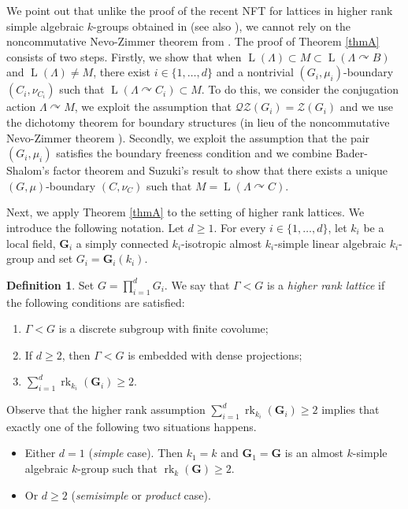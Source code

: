 \documentclass[11pt]{article}
\newenvironment{enumeratei}
{\bgroup\def\theenumi{\roman{enumi}}\def\theenumii{\arabic{enumii}}\begin{enumerate}}
{\end{enumerate}\egroup}
\newcommand{\bG}{\boldsymbol{G}}
\theoremstyle{definition}
\newtheorem*{definition}{Definition}
\DeclareMathOperator{\rk}{rk}
\DeclareMathOperator{\rL}{L}
\begin{document}
We point out that unlike the proof of the recent NFT for lattices in higher rank simple algebraic $k$-groups obtained in \cite{BBH21} (see also \cite{Ho21}), we cannot rely on the noncommutative Nevo-Zimmer theorem from \cite{BH19, BBH21}. The proof of Theorem \ref{thmA} consists of two steps. Firstly, we show that when $\rL(\Lambda) \subset M \subset \rL(\Lambda \curvearrowright B)$ and $\rL(\Lambda) \neq M$, there exist $i \in \{1, \dots, d\}$ and a nontrivial $(G_i, \mu_i)$-boundary $(C_i, \nu_{C_i})$ such that $\rL(\Lambda \curvearrowright C_i) \subset M$. To do this, we consider the conjugation action $\Lambda \curvearrowright M$, we exploit the assumption that $\mathscr{Q}\mathscr{Z}(G_i) = \mathscr Z(G_i)$ and we use the dichotomy theorem for boundary structures \cite[Th.\,5.8]{BBHP20} (in lieu of the noncommutative Nevo-Zimmer theorem \cite{BH19, BBH21}). Secondly, we exploit the assumption that the pair $(G_i, \mu_i)$ satisfies the boundary freeness condition and we combine Bader-Shalom's factor theorem \cite{BS04} and Suzuki's result \cite{Su18} to show that there exists a unique $(G, \mu)$-boundary $(C, \nu_C)$ such that $M = \rL(\Lambda \curvearrowright C)$.

Next, we apply Theorem \ref{thmA} to the setting of higher rank lattices. We introduce the following notation. Let $d \geq 1$. For every $i \in \{1, \dots, d\}$, let $k_i$ be a local field, $\bG_i$ a simply connected $k_i$-isotropic almost $k_i$-simple linear algebraic $k_i$-group and set $G_i = \bG_i(k_i)$.

\begin{definition}
Set $G = \prod_{i = 1}^d G_i$. We say that $\Gamma < G$ is a \emph{higher rank lattice} if the following conditions are satisfied:
\begin{enumeratei}
\item
$\Gamma < G$ is a discrete subgroup with finite covolume;
\item
If $d \geq 2$, then $\Gamma < G$ is embedded with dense projections;
\item
$\sum_{i = 1}^d \rk_{k_i}(\bG_i) \geq 2$.
\end{enumeratei}
\end{definition}

Observe that the higher rank assumption $\sum_{i = 1}^d \rk_{k_i}(\bG_i) \geq 2$ implies that exactly one of the following two situations happens.
\begin{itemize}
\item Either $d = 1$ (\emph{simple} case). Then $k_1 = k$ and $\bG_1 = \bG$ is an almost $k$-simple algebraic $k$-group such that $\rk_k(\bG) \geq 2$.
\item Or $d \geq 2$ (\emph{semisimple} or \emph{product} case).
\end{itemize}
\end{document}
